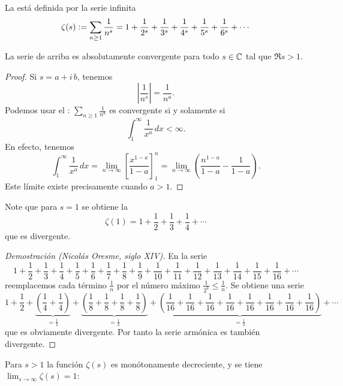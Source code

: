 \documentclass{article}
\numberwithin{equation}{section}
\theoremstyle{definition}
\begin{document}
\begin{definicion}
  La  está definida por la serie infinita
  $$\zeta (s) \mathrel{\mathop:}= \sum_{n \ge 1} \frac{1}{n^s} =
  1 + \frac{1}{2^s} + \frac{1}{3^s} + \frac{1}{4^s} + \frac{1}{5^s} + \frac{1}{6^s} + \cdots$$
\end{definicion}

\begin{observacion}
  La serie de arriba es absolutamente convergente para todo $s \in \mathbb{C}$ tal que
  $\Re s > 1$.

  \begin{proof}
    Si $s = a + i\,b$, tenemos
    $$\left|\frac{1}{n^s}\right| = \frac{1}{n^a}.$$
    Podemos usar el :
    $\sum_{n \ge 1} \frac{1}{n^a}$ es convergente si y solamente si
    $$\int_1^\infty \frac{1}{x^a}\,dx < \infty.$$
    En efecto, tenemos
    $$\int_1^\infty \frac{1}{x^a}\,dx =
    \lim_{n \to \infty} \left[\frac{x^{1-a}}{1-a}\right]^n_1 =
    \lim_{n \to \infty} \left(\frac{n^{1-a}}{1-a} - \frac{1}{1-a}\right).$$
    Este límite existe precisamente cuando $a > 1$.
  \end{proof}
\end{observacion}

Note que para $s = 1$ se obtiene la 
$$\zeta (1) = 1 + \frac{1}{2} + \frac{1}{3} + \frac{1}{4} + \cdots$$
que es divergente.

\begin{proof}[Demostración (Nicolás Oresme, siglo XIV)]
  En la serie
  $$1 + \frac{1}{2} + \frac{1}{3} + \frac{1}{4} +
  \frac{1}{5} + \frac{1}{6} + \frac{1}{7} + \frac{1}{8} +
  \frac{1}{9} + \frac{1}{10} + \frac{1}{11} + \frac{1}{12} +
  \frac{1}{13} + \frac{1}{14} + \frac{1}{15} + \frac{1}{16} + \cdots$$
  reemplacemos cada término $\frac{1}{n}$ por el número máximo
  $\frac{1}{2^k} \le \frac{1}{n}$. Se obtiene una serie
  $$1 + \frac{1}{2} + \underbrace{\left(\frac{1}{4} + \frac{1}{4}\right)}_{= \frac{1}{2}} +
  \underbrace{\left(\frac{1}{8} + \frac{1}{8} + \frac{1}{8} + \frac{1}{8}\right)}_{= \frac{1}{2}} +
  \underbrace{\left(\frac{1}{16} + \frac{1}{16} + \frac{1}{16} + \frac{1}{16} + \frac{1}{16} + \frac{1}{16} + \frac{1}{16} + \frac{1}{16}\right)}_{= \frac{1}{2}} + \cdots$$
  que es obviamente divergente. Por tanto la serie armónica es también
  divergente.
\end{proof}

\pagebreak

Para $s > 1$ la función $\zeta (s)$ es monótonamente decreciente, y se tiene
$\lim_{s\to \infty} \zeta (s) = 1$:
\end{document}
